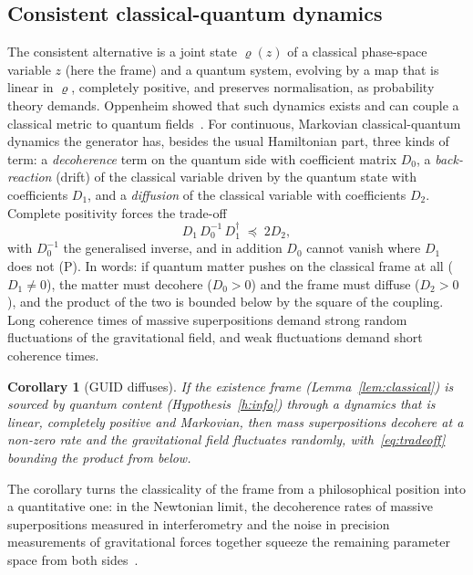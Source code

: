 \documentclass[11pt,a4paper]{article}
\newtheorem{corollary}{Corollary}
\theoremstyle{definition}
\theoremstyle{remark}
\newcommand{\tagP}{\textsf{(P)}}
\theoremstyle{definition}
\begin{document}
\subsection{Consistent classical-quantum dynamics}

The consistent alternative is a joint state $\varrho(z)$ of a classical phase-space variable $z$ (here the frame) and a quantum system,
evolving by a map that is linear in $\varrho$, completely positive, and preserves normalisation, as probability theory demands. Oppenheim
showed that such dynamics exists and can couple a classical metric to quantum fields~\cite{oppenheim}. For continuous, Markovian
classical-quantum dynamics the generator has, besides the usual Hamiltonian part, three kinds of term: a \emph{decoherence} term on the
quantum side with coefficient matrix $D_0$, a \emph{back-reaction} (drift) of the classical variable driven by the quantum state with
coefficients $D_1$, and a \emph{diffusion} of the classical variable with coefficients $D_2$. Complete positivity forces the
trade-off~\cite[Eq.~(23)]{osswd}
\begin{equation}\label{eq:tradeoff}
D_1\,D_0^{-1}\,D_1^{\dagger}\;\preceq\;2D_2 ,
\end{equation}
with $D_0^{-1}$ the generalised inverse, and in addition $D_0$ cannot vanish where $D_1$ does not \tagP. In words: if quantum matter pushes on
the classical frame at all ($D_1\neq0$), the matter must decohere ($D_0>0$) and the frame must diffuse ($D_2>0$), and the product of the two
is bounded below by the square of the coupling. Long coherence times of massive superpositions demand strong random fluctuations of the
gravitational field, and weak fluctuations demand short coherence times.

\begin{corollary}[GUID diffuses]\label{co:diffuse}
If the existence frame (Lemma~\ref{lem:classical}) is sourced by quantum content (Hypothesis~\ref{h:info}) through a dynamics that is linear,
completely positive and Markovian, then mass superpositions decohere at a non-zero rate and the gravitational field fluctuates randomly,
with~\eqref{eq:tradeoff} bounding the product from below.
\end{corollary}

The corollary turns the classicality of the frame from a philosophical position into a quantitative one: in the Newtonian limit, the
decoherence rates of massive superpositions measured in interferometry and the noise in precision measurements of gravitational forces
together squeeze the remaining parameter space from both sides~\cite{osswd}.
\end{document}
